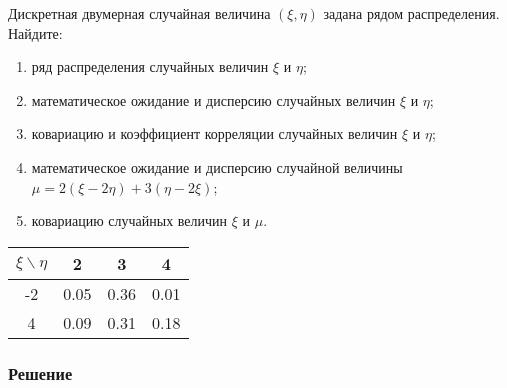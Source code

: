 \documentclass[12pt]{article}
\begin{document}
Дискретная двумерная случайная величина $(\xi, \eta)$ задана рядом распределения.
Найдите:

\begin{enumerate}
	\item ряд распределения случайных величин $\xi$ и $\eta$;
	\item математическое ожидание и дисперсию случайных величин $\xi$ и $\eta$;
	\item ковариацию и коэффициент корреляции случайных величин $\xi$ и $\eta$;
	\item математическое ожидание и дисперсию случайной величины $\mu = 2(\xi - 2\eta) + 3(\eta - 2\xi)$;
	\item ковариацию случайных величин $\xi$ и $\mu$.
\end{enumerate}

\begin{tabular}{|c|c|c|c|}
	\hline
	$\xi \backslash \eta$ & 2    & 3    & 4    \\
	\hline
	-2                    & 0.05 & 0.36 & 0.01 \\
	\hline
	4                     & 0.09 & 0.31 & 0.18 \\
	\hline
\end{tabular}

\subsubsection*{Решение}
\end{document}
